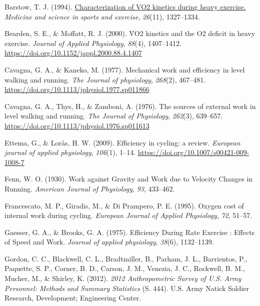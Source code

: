 \documentclass[
  letterpaper,
  DIV=11]{scrartcl}
\newlength{\cslhangindent}
\newenvironment{CSLReferences}[2] %
 {\begin{list}{}{%
  \setlength{\itemindent}{0pt}
  \setlength{\leftmargin}{0pt}
  \setlength{\parsep}{0pt}
  \ifodd #1
   \setlength{\leftmargin}{\cslhangindent}
   \setlength{\itemindent}{-1\cslhangindent}
  \fi
  \setlength{\itemsep}{#2\baselineskip}}}
 {\end{list}}
\begin{document}
\label{refs}
\begin{CSLReferences}{1}{0}
Barstow, T. J. (1994).
\href{https://www.ncbi.nlm.nih.gov/pubmed/7837952}{{Characterization of
VO2 kinetics during heavy exercise.}} \emph{Medicine and science in
sports and exercise}, \emph{26}(11), 1327--1334.

Bearden, S. E., \& Moffatt, R. J. (2000). {V̇O2 kinetics and the O2
deficit in heavy exercise}. \emph{Journal of Applied Physiology},
\emph{88}(4), 1407--1412.
\url{https://doi.org/10.1152/jappl.2000.88.4.1407}

Cavagna, G. A., \& Kaneko, M. (1977). {Mechanical work and efficiency in
level walking and running}. \emph{The Journal of physiology},
\emph{268}(2), 467--481.
\url{https://doi.org/10.1113/jphysiol.1977.sp011866}

Cavagna, G. A., Thys, H., \& Zamboni, A. (1976). {The sources of
external work in level walking and running.} \emph{The Journal of
Physiology}, \emph{262}(3), 639--657.
\url{https://doi.org/10.1113/jphysiol.1976.sp011613}

Ettema, G., \& Lorås, H. W. (2009). {Efficiency in cycling: a review.}
\emph{European journal of applied physiology}, \emph{106}(1), 1--14.
\url{https://doi.org/10.1007/s00421-009-1008-7}

Fenn, W. O. (1930). {Work against Gravity and Work due to Velocity
Changes in Running}. \emph{American Journal of Physiology}, \emph{93},
433--462.

Francescato, M. P., Giradis, M., \& Di Prampero, P. E. (1995). {Oxygen
cost of internal work during cycling}. \emph{European Journal of Applied
Physiology}, \emph{72}, 51--57.

Gaesser, G. A., \& Brooks, G. A. (1975). {Efficiency During Rate
Exercise : Effects of Speed and Work}. \emph{Journal of applied
physiology}, \emph{38}(6), 1132--1139.

Gordon, C. C., Blackwell, C. L., Bradtmiller, B., Parham, J. L.,
Barrientos, P., Paquette, S. P., Corner, B. D., Carson, J. M., Venezia,
J. C., Rockwell, B. M., Mucher, M., \& Shirley, K. (2012). \emph{{2012
Anthropometric Survey of U.S. Army Personnel: Methods and Summary
Statistics}} (S. 444). U.S. Army Natick Soldier Research, Development;
Engineering Center.


\end{CSLReferences}
\end{document}
